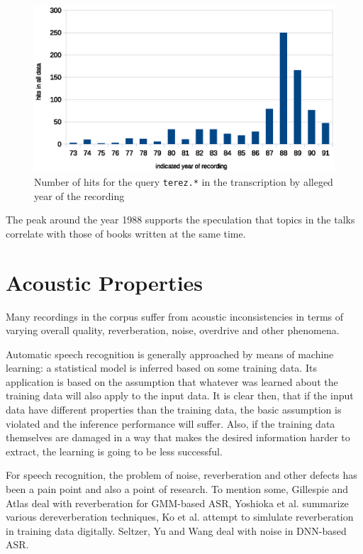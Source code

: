 \documentclass[12pt,a4paper]{report}
\begin{document}
\begin{figure}[htpb]
\includegraphics[scale=0.6]{rc/teresa-by-year.eps}
\caption{Number of hits for the query \texttt{terez.*} in the transcription by
alleged year of the recording}
\label{fig:teresa-year}
\end{figure}

The peak around the year 1988 supports the speculation that topics in the talks
correlate with those of books written at the same time.

\chapter{Acoustic Properties}
\label{chap:acoustics}

Many recordings in the corpus suffer from
acoustic inconsistencies in terms of varying
overall quality, reverberation, noise, overdrive and other phenomena.

Automatic speech recognition is generally approached by means of machine
learning: a statistical model is inferred based on some training data. Its
application is based on the assumption that whatever was learned about the training
data will also apply to the input data. It is clear then, that if the input
data have different properties than the training data, the basic assumption is
violated and the inference performance will suffer.
Also, if the training data themselves are damaged in a way that makes the desired
information harder to extract, the learning is going to be less successful.

For speech recognition, the problem of noise, reverberation and other defects
has been a pain point and also a point of research. To mention some, Gillespie
and Atlas\cite{gillespie2002diversity} deal with reverberation for
GMM-based ASR, Yoshioka et al.\cite{reverbmagazine} summarize various
dereverberation techniques, Ko et al.\cite{reverbaugment} attempt to
simlulate reverberation in training data digitally. Seltzer, Yu and
Wang\cite{dnnnoiserobust} deal with noise in DNN-based ASR.
\end{document}

